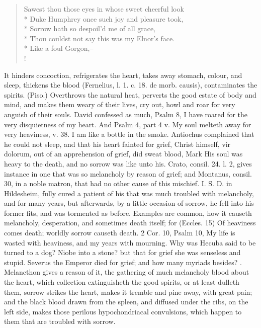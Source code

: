 {\begin{verse}
Sawest thou those eyes in whose sweet cheerful look\\*
Duke Humphrey once such joy and pleasure took,\\*
Sorrow hath so despoil'd me of all grace,\\*
Thou couldst not say this was my Elnor's face.\\*
Like a foul Gorgon,--\\!
\end{verse}

It hinders concoction, refrigerates the heart, takes away
stomach, colour, and sleep, thickens the blood (Fernelius, l. 1.
c. 18. \textlatin{de morb. causis}), contaminates the spirits. (Piso.)
Overthrows the natural heat, perverts the good estate of body and mind,
and makes them weary of their lives, cry out, howl and roar for very
anguish of their souls. David confessed as much, Psalm  8, I
have roared for the very disquietness of my heart. And Psalm  4,
part 4 v. My soul melteth away for very heaviness, v. 38. I am like a
bottle in the smoke. Antiochus complained that he could not sleep, and
that his heart fainted for grief, Christ himself, vir dolorum,
out of an apprehension of grief, did sweat blood, Mark  His soul
was heavy to the death, and no sorrow was like unto his. Crato, consil.
24. l. 2, gives instance in one that was so melancholy by reason of
grief; and Montanus, consil. 30, in a noble matron, that
had no other cause of this mischief. I. S. D. in Hildesheim, fully
cured a patient of his that was much troubled with melancholy, and for
many years, but afterwards, by a little occasion of sorrow, he
fell into his former fits, and was tormented as before. Examples are
common, how it causeth melancholy, desperation, and sometimes
death itself; for (Eccles.  15) Of heaviness comes death;
worldly sorrow causeth death. 2 Cor.  10, Psalm  10, My life
is wasted with heaviness, and my years with mourning. Why was Hecuba
said to be turned to a dog? Niobe into a stone? but that for grief she
was senseless and stupid. Severus the Emperor  died for grief;
and how many myriads besides? . Melancthon gives a reason of it, the
gathering of much melancholy blood about the heart, which collection
extinguisheth the good spirits, or at least dulleth them, sorrow
strikes the heart, makes it tremble and pine away, with great pain; and
the black blood drawn from the spleen, and diffused under the ribs, on
the left side, makes those perilous hypochondriacal convulsions, which
happen to them that are troubled with sorrow.

}
